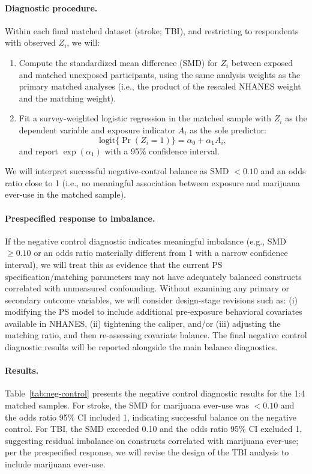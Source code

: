 \documentclass{article}
\begin{document}
\paragraph{Diagnostic procedure.}
Within each final matched dataset (stroke; TBI), and restricting to respondents with observed $Z_i$, we will:
\begin{enumerate}
    \item Compute the standardized mean difference (SMD) for $Z_i$ between exposed and matched unexposed participants, using the same analysis weights as the primary matched analyses (i.e., the product of the rescaled NHANES weight and the matching weight).
    \item Fit a survey-weighted logistic regression in the matched sample with $Z_i$ as the dependent variable and exposure indicator $A_i$ as the sole predictor:
    \[
    \text{logit}\{\Pr(Z_i = 1)\} = \alpha_0 + \alpha_1 A_i,
    \]
    and report $\exp(\alpha_1)$ with a 95\% confidence interval.
\end{enumerate}
We will interpret successful negative-control balance as SMD $<0.10$ and an odds ratio close to 1 (i.e., no meaningful association between exposure and marijuana ever-use in the matched sample).

\paragraph{Prespecified response to imbalance.}
If the negative control diagnostic indicates meaningful imbalance (e.g., SMD $\ge 0.10$ or an odds ratio materially different from 1 with a narrow confidence interval), we will treat this as evidence that the current PS specification/matching parameters may not have adequately balanced constructs correlated with unmeasured confounding. Without examining any primary or secondary outcome variables, we will consider design-stage revisions such as: (i) modifying the PS model to include additional pre-exposure behavioral covariates available in NHANES, (ii) tightening the caliper, and/or (iii) adjusting the matching ratio, and then re-assessing covariate balance. The final negative control diagnostic results will be reported alongside the main balance diagnostics.

\paragraph{Results.}
Table~\ref{tab:neg-control} presents the negative control diagnostic results for the 1:4 matched samples. For stroke, the SMD for marijuana ever-use was $<0.10$ and the odds ratio 95\% CI included 1, indicating successful balance on the negative control. For TBI, the SMD exceeded 0.10 and the odds ratio 95\% CI excluded 1, suggesting residual imbalance on constructs correlated with marijuana ever-use; per the prespecified response, we will revise the design of the TBI analysis to include marijuana ever-use.
\end{document}
